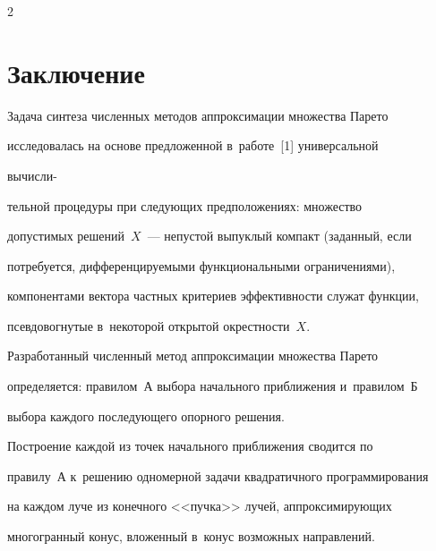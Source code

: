 \begin{multicols}{2}
\section{Заключение}





\vspace*{-3pt}





  Задача синтеза численных методов аппроксимации множества Парето 


исследовалась на основе предложенной в~работе~[1] универсальной 


вычисли-\linebreak\vspace*{-12pt}





\pagebreak





\noindent


тельной процедуры при следующих предположениях: множество 


допустимых решений~$X$~--- непустой выпуклый компакт (заданный, если 


потребуется, дифференцируемыми функциональными ограничениями), 


компонентами вектора частных критериев эффективности служат функции, 


псевдовогнутые в~некоторой открытой окрестности~$X$.


  


  Разработанный численный метод аппроксимации множества Парето 


определяется: правилом~А выбора начального приближения и~правилом~Б 


выбора каждого последующего опорного решения.


  


  Построение каждой из точек начального приближения сводится по 


правилу~А к~решению одномерной задачи квадратичного программирования 


на каждом луче из конечного <<пучка>> лучей, аппроксимирующих 


многогранный конус, вложенный в~конус возможных направлений. 


  



\end{multicols}
